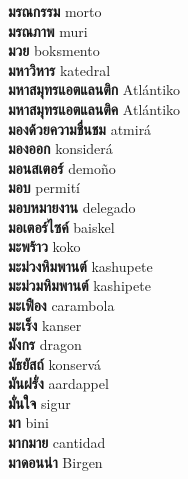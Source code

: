 \textbf{ มรณกรรม  } morto \\
\textbf{ มรณภาพ  } muri \\
\textbf{ มวย  } boksmento \\
\textbf{ มหาวิหาร  } katedral \\
\textbf{ มหาสมุทรแอตแลนติก  } Atlántiko \\
\textbf{ มหาสมุทรแอตแลนติค  } Atlántiko \\
\textbf{ มองด้วยความชื่นชม  } atmirá \\
\textbf{ มองออก  } konsiderá \\
\textbf{ มอนสเตอร์  } demoño \\
\textbf{ มอบ  } permití \\
\textbf{ มอบหมายงาน  } delegado \\
\textbf{ มอเตอร์ไซค์  } baiskel \\
\textbf{ มะพร้าว  } koko \\
\textbf{ มะม่วงหิมพานต์  } kashupete \\
\textbf{ มะม่วมหิมพานต์  } kashipete \\
\textbf{ มะเฟือง  } carambola \\
\textbf{ มะเร็ง  } kanser \\
\textbf{ มังกร  } dragon \\
\textbf{ มัธยัสถ์  } konservá \\
\textbf{ มันฝรั่ง  } aardappel \\
\textbf{ มั่นใจ  } sigur \\
\textbf{ มา  } bini \\
\textbf{ มากมาย  } cantidad \\
\textbf{ มาดอนน่า  } Birgen \\
